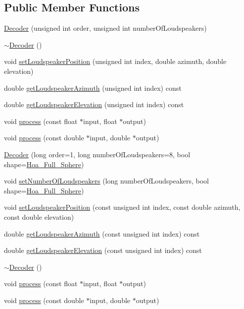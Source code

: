 \subsection*{Public Member Functions}
\begin{DoxyCompactItemize}
\item 
\hyperlink{class_hoa3_d_1_1_decoder_aefb3c6a2fd27592480d8198c06ea0968}{Decoder} (unsigned int order, unsigned int number\-Of\-Loudspeakers)
\item 
\hyperlink{class_hoa3_d_1_1_decoder_acc197bebb310a82756ee2061fe371e2d}{$\sim$\-Decoder} ()
\item 
void \hyperlink{class_hoa3_d_1_1_decoder_ade9c4f54765c1de0f27fadf0b25e88f9}{set\-Loudspeaker\-Position} (unsigned int index, double azimuth, double elevation)
\item 
double \hyperlink{class_hoa3_d_1_1_decoder_a23df7388f6d6b2915566f5aa6d294056}{get\-Loudspeaker\-Azimuth} (unsigned int index) const 
\item 
double \hyperlink{class_hoa3_d_1_1_decoder_aa5102482919297cee85af49991c5984f}{get\-Loudspeaker\-Elevation} (unsigned int index) const 
\item 
void \hyperlink{class_hoa3_d_1_1_decoder_a146f985ebda8e825db2a2ed2cafd5ba6}{process} (const float $\ast$input, float $\ast$output)
\item 
void \hyperlink{class_hoa3_d_1_1_decoder_a2a1931b2fe5c5def0baa9c4d637379a9}{process} (const double $\ast$input, double $\ast$output)
\item 
\hyperlink{class_hoa3_d_1_1_decoder_a0900afc94e0ae855feaf009b97ec9e75}{Decoder} (long order=1, long number\-Of\-Loudspeakers=8, bool shape=\hyperlink{namespace_hoa3_d_a96e1558dd670aa7cddab38a58aa10c49aeb2d6c7f779a838421f9999a46a2ca22}{Hoa\-\_\-\-Full\-\_\-\-Sphere})
\item 
void \hyperlink{class_hoa3_d_1_1_decoder_a4a5e94dc4bb0f1d9989659be522a0e8b}{set\-Number\-Of\-Loudspeakers} (long number\-Of\-Loudspeakers, bool shape=\hyperlink{namespace_hoa3_d_a96e1558dd670aa7cddab38a58aa10c49aeb2d6c7f779a838421f9999a46a2ca22}{Hoa\-\_\-\-Full\-\_\-\-Sphere})
\item 
void \hyperlink{class_hoa3_d_1_1_decoder_a18cc28c0db47350ece9ad51473ef62a0}{set\-Loudspeaker\-Position} (const unsigned int index, const double azimuth, const double elevation)
\item 
double \hyperlink{class_hoa3_d_1_1_decoder_aa30367ecd70695bd0d5bc60a730785a2}{get\-Loudspeaker\-Azimuth} (const unsigned int index) const 
\item 
double \hyperlink{class_hoa3_d_1_1_decoder_aa8afd37b12fca98cb9bda753be49effb}{get\-Loudspeaker\-Elevation} (const unsigned int index) const 
\item 
\hyperlink{class_hoa3_d_1_1_decoder_acc197bebb310a82756ee2061fe371e2d}{$\sim$\-Decoder} ()
\item 
void \hyperlink{class_hoa3_d_1_1_decoder_a146f985ebda8e825db2a2ed2cafd5ba6}{process} (const float $\ast$input, float $\ast$output)
\item 
void \hyperlink{class_hoa3_d_1_1_decoder_a2a1931b2fe5c5def0baa9c4d637379a9}{process} (const double $\ast$input, double $\ast$output)
\end{DoxyCompactItemize}


